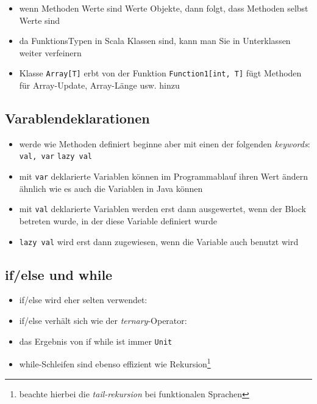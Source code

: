 

\begin{itemize}
  \item wenn Methoden Werte sind \und Werte Objekte, dann folgt, dass Methoden
  selbst Werte sind
\end{itemize}




\begin{itemize}
  \item da FunktionsTypen in Scala Klassen sind, kann man Sie in Unterklassen
  weiter verfeinern
  \item Klasse \texttt{Array[T]} erbt von der Funktion \texttt{Function1[int, T]}
  \und fügt Methoden für Array-Update, Array-Länge usw. hinzu
  
  
\end{itemize}


\subsection{Varablendeklarationen}
\begin{itemize}
  \item werde wie Methoden definiert beginne aber mit einen der folgenden
  \textit{keywords}: \texttt{val, var} \oder \texttt{lazy val}
  \item mit \texttt{var} deklarierte Variablen können im Programmablauf
  ihren Wert ändern ähnlich wie es auch die Variablen in Java können
  \item mit \texttt{val} deklarierte Variablen werden erst dann ausgewertet,
  wenn der Block betreten wurde, in der diese Variable definiert wurde
  \item \texttt{lazy val} wird erst dann zugewiesen, wenn die Variable auch
  benutzt wird
\end{itemize}


\subsection{if/else und while}
\begin{itemize}
  \item if/else wird eher selten verwendet:
  
  
  
  \item if/else verhält sich wie der \textit{ternary}-Operator:
  
  
  
  \item das Ergebnis von if \und while ist immer \texttt{Unit}
  \item while-Schleifen sind ebenso effizient wie 
  Rekursion\footnote{beachte hierbei die \textit{tail-rekursion} bei
  funktionalen Sprachen}
  
  
  
\end{itemize}


